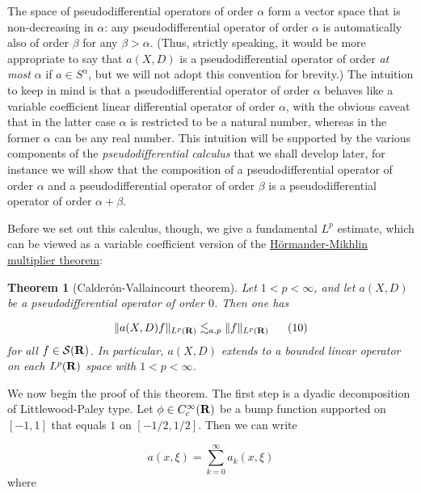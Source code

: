\documentclass[11pt]{article}
\newtheorem{theorem}{Theorem}
\theoremstyle{definition}
\theoremstyle{remark}
\begin{document}
The space of pseudodifferential operators of order \({\alpha}\) form a vector space that is non-decreasing in \({\alpha}\): any pseudodifferential operator of order \({\alpha}\) is automatically also of order \({\beta}\) for any \({\beta>\alpha}\). (Thus, strictly speaking, it would be more appropriate to say that \({a(X,D)}\) is a pseudodifferential operator of order \emph{at most} \({\alpha}\) if \({a \in S^\alpha}\), but we will not adopt this convention for brevity.) The intuition to keep in mind is that a pseudodifferential operator of order \({\alpha}\) behaves like a variable coefficient linear differential operator of order \({\alpha}\), with the obvious caveat that in the latter case \({\alpha}\) is restricted to be a natural number, whereas in the former \({\alpha}\) can be any real number. This intuition will be supported by the various components of the \emph{pseudodifferential calculus} that we shall develop later, for instance we will show that the composition of a pseudodifferential operator of order \({\alpha}\) and a pseudodifferential operator of order \({\beta}\) is a pseudodifferential operator of order \({\alpha+\beta}\).



Before we set out this calculus, though, we give a fundamental \({L^p}\) estimate, which can be viewed as a variable coefficient version of the \href{https://en.wikipedia.org/wiki/Multiplier_(Fourier_analysis)#Mikhlin_multiplier_theorem}{Hörmander-Mikhlin multiplier theorem}:


\begin{theorem}[Calderón-Vallaincourt theorem]
 \label{cv} Let \({1 < p < \infty}\), and let \({a(X,D)}\) be a pseudodifferential operator of order \({0}\). Then one has \label{clp}

\[\displaystyle  \| a(X,D) f\|_{L^p({\bf R})} \lesssim_{a,p} \|f\|_{L^p({\bf R})} \ \ \ \ \ (10)\]
 for all \({f \in {\mathcal S}({\bf R})}\). In particular, \({a(X,D)}\) extends to a bounded linear operator on each \({L^p({\bf R})}\) space with \({1 < p < \infty}\). 

\end{theorem}

We now begin the proof of this theorem. The first step is a dyadic decomposition of Littlewood-Paley type. Let \({\phi \in C^\infty_c({\bf R})}\) be a bump function supported on \({[-1,1]}\) that equals \({1}\) on \({[-1/2,1/2]}\). Then we can write 

\[\displaystyle  a(x,\xi) = \sum_{k=0}^\infty a_k(x,\xi)\]
 where 
\end{document}
